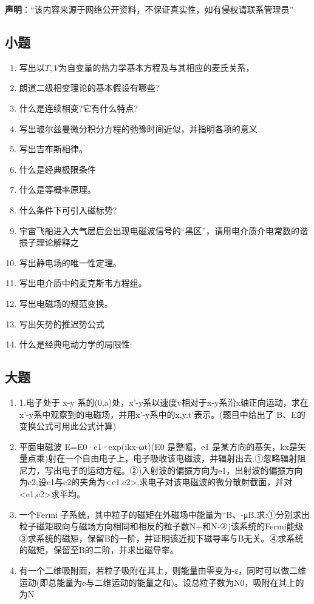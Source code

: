 
\textbf{声明}：“该内容来源于网络公开资料，不保证真实性，如有侵权请联系管理员”
\subsection{小题}
\begin{enumerate}
\item 写出以$T,V$为自变量的热力学基本方程及与其相应的麦氏关系，
\item 朗道二级相变理论的基本假设有哪些?
\item 什么是连续相变?它有什么特点?
\item 写出玻尔兹曼微分积分方程的弛豫时间近似，并指明各项的意义
\item 写出吉布斯相律。
\item 什么是经典极限条件
\item 什么是等概率原理。
\item 什么条件下可引入磁标势?
\item 宇宙飞船进入大气层后会出现电磁波信号的“黑区”，请用电介质介电常数的谐振子理论解释之
\item 写出静电场的唯一性定理。
\item 写出电介质中的麦克斯韦方程组。
\item 写出电磁场的规范变换。
\item 写出矢势的推迟势公式
\item 什么是经典电动力学的局限性:
\end{enumerate}
\subsection{大题}
\begin{enumerate}
\item 1.电子处于 x-y 系的(0,a)处，x’-y系以速度v相对于x-y系沿x轴正向运动，求在x'-y系中观察到的电磁场，并用x’-y系中的x,y.t’表示。(题目中给出了 B、E的变换公式可用此公式计算)
\item 平面电磁波 E=E0·e1·exp(ikx-ωt)(E0 是整幅，e1 是某方向的基矢，kx是矢量点乘)射在一个自由电子上，电子吸收该电磁波，并辐射出去.①忽略辐射阻尼力，写出电子的运动方程。②)入射波的偏振方向为e1，出射波的偏振方向为e2,设e1与e2的夹角为<e1.e2>,求电子对该电磁波的微分散射截面，并对<e1,e2>求平均。
\item 一个Fermi 子系统，其中粒子的磁矩在外磁场中能量为“B、-μB.求:①分别求出粒子磁矩取向与磁场方向相同和相反的粒子数N+和N-②)该系统的Fermi能级③求系统的磁矩，保留B的一阶，并证明该近视下磁导率与B无关。④求系统的磁矩，保留至B的二阶，并求出磁导率。
\item 有一个二维吸附面，若粒子吸附在其上，则能量由零变为-ε，同时可以做二维运动(即总能量为e与二维运动的能量之和)。设总粒子数为N0，吸附在其上的为N
\end{enumerate}
